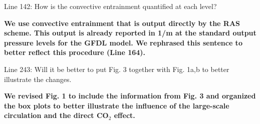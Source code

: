 \documentclass[11pt]{article}
\begin{document}
Line 142: How is the convective entrainment quantified at each level?

\textbf{We use convective entrainment that is output directly by the RAS scheme. This output is already reported in 1/m at the standard output pressure levels for the GFDL model. We rephrased this sentence to better reflect this procedure (Line 164).}

Line 243: Will it be better to put Fig. 3 together with Fig. 1a,b to better illustrate the changes.

\textbf{We revised Fig. 1 to include the information from Fig. 3 and organized the box plots to better illustrate the influence of the large-scale circulation and the direct CO\(_2\) effect.}



\end{document}
